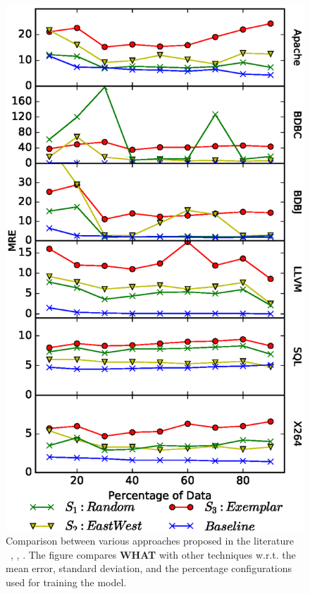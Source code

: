 \documentclass{sig-alternative}
\newcommand{\what}{{\bf WHAT }}
\begin{document}
\begin{figure}[!t]
\includegraphics[width=0.9\linewidth]{Figures/SamplingAccuracy.eps}
\caption{Comparison between various approaches proposed in the literature ~\cite{siegmund2012predicting}, \cite{guo2013variability}, \cite{sarkar2015cost}. The figure compares \what with other techniques w.r.t. the mean error, standard deviation, and the percentage configurations used for training the model.}\label{fig:Comparison}
\end{figure}

% 

% 

% 
\end{document}
